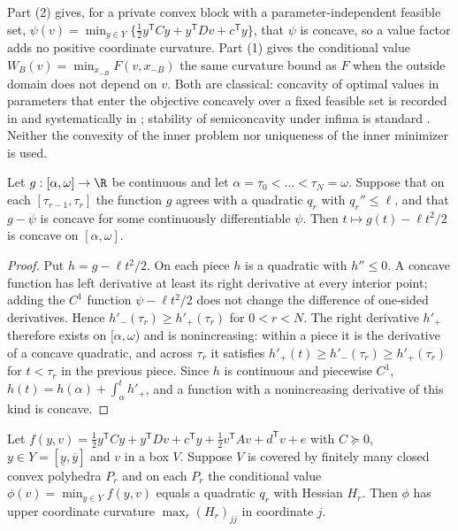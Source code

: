 \begin{remark}
Part (2) gives, for a private convex block with a parameter-independent feasible set,
$\psi(v)=\min_{y\in Y}\{\tfrac12y^{\mathsf T}Cy+y^{\mathsf T}Dv+c^{\mathsf T}y\}$, that $\psi$ is
concave, so a value factor adds no positive coordinate curvature. Part (1) gives the conditional
value $W_B(v)=\min_{x_{-B}}F(v,x_{-B})$ the same curvature bound as $F$ when the outside domain
does not depend on $v$. Both are classical: concavity of optimal values in parameters that enter
the objective concavely over a fixed feasible set is recorded in \cite{MangasarianRosen1964} and
systematically in \cite{FiaccoKyparisis1986}; stability of semiconcavity under infima is standard
\cite{CannarsaSinestrari2004}. Neither the convexity of the inner problem nor uniqueness of the
inner minimizer is used.
\end{remark}

\begin{lemma}\label{lit:lem:kinks}
Let $g:[\alpha,\omega]\to\R$ be continuous and let $\alpha=\tau_0<\dots<\tau_N=\omega$. Suppose
that on each $[\tau_{r-1},\tau_r]$ the function $g$ agrees with a quadratic $q_r$ with
$q_r''\le\ell$, and that $g-\psi$ is concave for some continuously differentiable $\psi$. Then
$t\mapsto g(t)-\ell t^2/2$ is concave on $[\alpha,\omega]$.
\end{lemma}

\begin{proof}
Put $h=g-\ell t^2/2$. On each piece $h$ is a quadratic with $h''\le0$. A concave function has
left derivative at least its right derivative at every interior point; adding the
$C^1$ function $\psi-\ell t^2/2$ does not change the difference of one-sided derivatives. Hence
$h'_-(\tau_r)\ge h'_+(\tau_r)$ for $0<r<N$. The right derivative $h'_+$ therefore exists on
$[\alpha,\omega)$ and is nonincreasing: within a piece it is the derivative of a concave
quadratic, and across $\tau_r$ it satisfies $h'_+(t)\ge h'_-(\tau_r)\ge h'_+(\tau_r)$ for
$t<\tau_r$ in the previous piece. Since $h$ is continuous and piecewise $C^1$,
$h(t)=h(\alpha)+\int_\alpha^th'_+$, and a function with a nonincreasing derivative of this kind is
concave.
\end{proof}

\begin{corollary}\label{lit:cor:partition}
Let $f(y,v)=\tfrac12y^{\mathsf T}Cy+y^{\mathsf T}Dv+c^{\mathsf T}y+\tfrac12v^{\mathsf T}Av+d^{\mathsf T}v+e$
with $C\succeq0$, $y\in Y=[\underline y,\overline y]$ and $v$ in a box $V$. Suppose $V$ is covered by finitely many
closed convex polyhedra $P_r$ and on each $P_r$ the conditional value
$\phi(v)=\min_{y\in Y}f(y,v)$ equals a quadratic $q_r$ with Hessian $H_r$. Then $\phi$ has
upper coordinate curvature $\max_r(H_r)_{jj}$ in coordinate $j$.
\end{corollary}


